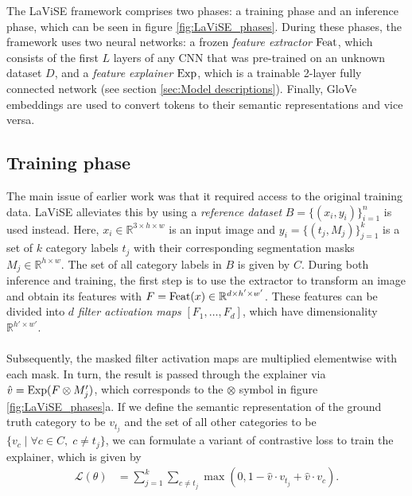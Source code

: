 The LaViSE framework comprises two phases: a training phase and an inference phase, which can be seen in figure \ref{fig:LaViSE_phases}. During these phases, the framework uses two neural networks: a frozen \textit{feature extractor} $\text{Feat}$, which consists of the first $L$ layers of any CNN that was pre-trained on an unknown dataset $D$, and a \textit{feature explainer} $\text{Exp}$, which is a trainable 2-layer fully connected network (see section \ref{sec:Model descriptions}). Finally, GloVe embeddings \cite{pennington2014glove} are used to convert tokens to their semantic representations and vice versa.

\subsection{Training phase} \label{sec:Training phase}
The main issue of earlier work was that it required access to the original training data. LaViSE alleviates this by using a \textit{reference dataset} $B = \{(x_i, y_i)\}_{i=1}^n$ is used instead. Here, $x_i \in \mathbb{R}^{3 \times h \times w}$ is an input image and $y_i = \{(t_j, M_j)\}_{j=1}^k$ is a set of $k$ category labels $t_j$ with their corresponding segmentation masks $M_j \in \mathbb{R}^{h \times w}$. The set of all category labels in $B$ is given by $C$. During both inference and training, the first step is to use the extractor to transform an image and obtain its features with $F = \text{Feat}(x) \in \mathbb{R}^{d \times h' \times w'}$. These features can be divided into $d$ \textit{filter activation maps} $[F_1, \dots, F_d]$, which have dimensionality $\mathbb{R}^{h' \times w'}$.
\\\\
Subsequently, the masked filter activation maps are multiplied elementwise with each mask. In turn, the result is passed through the explainer via $\hat v = \text{Exp}(F \otimes M_j')$, which corresponds to the $\otimes$ symbol in figure \ref{fig:LaViSE_phases}a. If we define the semantic representation of the ground truth category to be $v_{t_j}$ and the set of all other categories to be $\{v_c \;|\; \forall c \in C,\; c \neq t_j\}$, we can formulate a variant of contrastive loss to train the explainer, which is given by
\begin{align*}
    \mathcal{L}(\theta) &= \sum_{j=1}^k \sum_{c \neq t_j} \max(0, 1 - \hat v \cdot v_{t_j} + \hat v \cdot v_c).
\end{align*}

